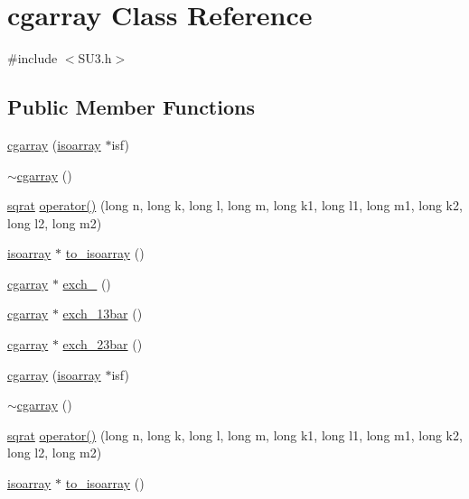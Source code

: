 \hypertarget{classcgarray}{}\section{cgarray Class Reference}
\label{classcgarray}


{\ttfamily \#include $<$S\+U3.\+h$>$}

\subsection*{Public Member Functions}
\begin{DoxyCompactItemize}
\item 
\mbox{\hyperlink{classcgarray_a0a9d804cf3256428f8d8937749a8b776}{cgarray}} (\mbox{\hyperlink{classisoarray}{isoarray}} $\ast$isf)
\item 
\mbox{\hyperlink{classcgarray_af332defc2438028410ad8e2ae98aa848}{$\sim$cgarray}} ()
\item 
\mbox{\hyperlink{classsqrat}{sqrat}} \mbox{\hyperlink{classcgarray_ad55c1e537d3070a732d9355ed351d53e}{operator()}} (long n, long k, long l, long m, long k1, long l1, long m1, long k2, long l2, long m2)
\item 
\mbox{\hyperlink{classisoarray}{isoarray}} $\ast$ \mbox{\hyperlink{classcgarray_af65861dda6c89fcaed8b73a40dfe88a6}{to\+\_\+isoarray}} ()
\item 
\mbox{\hyperlink{classcgarray}{cgarray}} $\ast$ \mbox{\hyperlink{classcgarray_a59212ed070a6ebdc199063d7c7eaee50}{exch\+\_}} ()
\item 
\mbox{\hyperlink{classcgarray}{cgarray}} $\ast$ \mbox{\hyperlink{classcgarray_a961a09e4792a1e3b9b9c7ac10f02bc1b}{exch\+\_\+13bar}} ()
\item 
\mbox{\hyperlink{classcgarray}{cgarray}} $\ast$ \mbox{\hyperlink{classcgarray_af5c8cdf36d5e417b29162ca27805fc1b}{exch\+\_\+23bar}} ()
\item 
\mbox{\hyperlink{classcgarray_a0a9d804cf3256428f8d8937749a8b776}{cgarray}} (\mbox{\hyperlink{classisoarray}{isoarray}} $\ast$isf)
\item 
\mbox{\hyperlink{classcgarray_af332defc2438028410ad8e2ae98aa848}{$\sim$cgarray}} ()
\item 
\mbox{\hyperlink{classsqrat}{sqrat}} \mbox{\hyperlink{classcgarray_ad55c1e537d3070a732d9355ed351d53e}{operator()}} (long n, long k, long l, long m, long k1, long l1, long m1, long k2, long l2, long m2)
\item 
\mbox{\hyperlink{classisoarray}{isoarray}} $\ast$ \mbox{\hyperlink{classcgarray_ade5be135cf4078de471bfb31497b0efa}{to\+\_\+isoarray}} ()

\end{DoxyCompactItemize}
